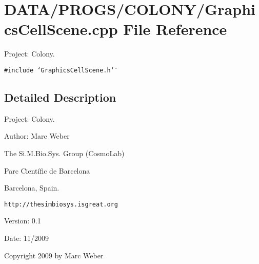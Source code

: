 \section{DATA/PROGS/COLONY/GraphicsCellScene.cpp File Reference}
\label{GraphicsCellScene_8cpp}
Project: Colony. 

{\tt \#include \char`\"{}GraphicsCellScene.h\char`\"{}}\par


\subsection{Detailed Description}
Project: Colony. 

\begin{Desc}
\item[Author:]Marc Weber\par
 The Si.M.Bio.Sys. Group (CosmoLab)\par
 Parc Científic de Barcelona\par
 Barcelona, Spain.\par
 {\tt http://thesimbiosys.isgreat.org} \end{Desc}
\begin{Desc}
\item[Version:]0.1 \end{Desc}
\begin{Desc}
\item[Date:]11/2009\end{Desc}
Copyright 2009 by Marc Weber 